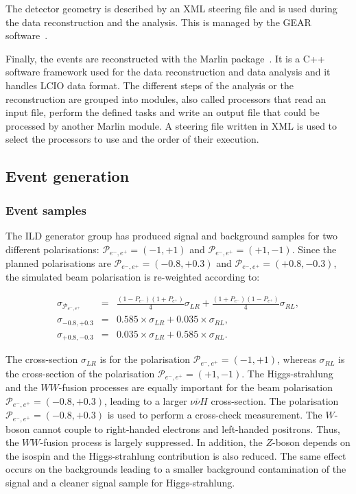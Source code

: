     The detector geometry is described by an XML steering file and is used during the data reconstruction and the analysis.
    This is managed by the \gls{GEAR} software~\cite{GEAR}.

    Finally, the events are reconstructed with the \gls{Marlin} package~\cite{MARLIN}.
    It is a C++ software framework used for the data reconstruction and data analysis and it handles \gls{LCIO} data format.
    The different steps of the analysis or the reconstruction are grouped into modules, also called processors that read an input file, perform the defined tasks and write an output file that could be processed by another \gls{Marlin} module.
    A steering file written in XML is used to select the processors to use and the order of their execution.

  \subsection{Event generation}
     
     \subsubsection{Event samples}

     The \gls{ILD} generator group has produced signal and background samples for two different polarisations:  $\mathcal{P}_{e^-,e^+} = (-1,+1)$ and $\mathcal{P}_{e^-,e^+} = (+1,-1)$.
     Since the planned polarisations are $\mathcal{P}_{e^-,e^+} = (-0.8,+0.3)$ and  $\mathcal{P}_{e^-,e^+} = (+0.8,-0.3)$, the simulated beam polarisation is re-weighted according to:
     
     \begin{equation}
       \begin{array}{lrc}
       \sigma_{\mathcal{P}_{e^-,e^+}} & = & \frac{(1 - P_{e^-})(1+P_{e^+})}{4} \sigma_{LR} + \frac{(1+P_{e^-})(1-P_{e^+})}{4} \sigma_{RL}, \\
       \sigma_{-0.8,+0.3} & = & 0.585 \times \sigma_{LR} + 0.035 \times \sigma_{RL}, \\
       \sigma_{+0.8,-0.3} & = & 0.035 \times \sigma_{LR} + 0.585 \times \sigma_{RL}.
       \end{array}
     \end{equation}

     The cross-section $\sigma_{LR}$ is for the polarisation $\mathcal{P}_{e^-,e^+} = (-1,+1)$, whereas $\sigma_{RL}$ is the cross-section of the polarisation $\mathcal{P}_{e^-,e^+} = (+1,-1)$.
     The Higgs-strahlung and the $WW$-fusion processes are equally important for the beam polarisation  $\mathcal{P}_{e^-,e^+} = (-0.8,+0.3)$, leading to a larger $\nu\overline{\nu} H$ cross-section.
     The polarisation $\mathcal{P}_{e^-,e^+} = (-0.8,+0.3)$ is used to perform a cross-check measurement.
     The $W$-boson cannot couple to right-handed electrons and left-handed positrons.
     Thus, the $WW$-fusion process is largely suppressed.
     In addition, the $Z$-boson depends on the isospin and the Higgs-strahlung contribution is also reduced.
     The same effect occurs on the backgrounds leading to a smaller background contamination of the signal and a cleaner signal sample for Higgs-strahlung.

